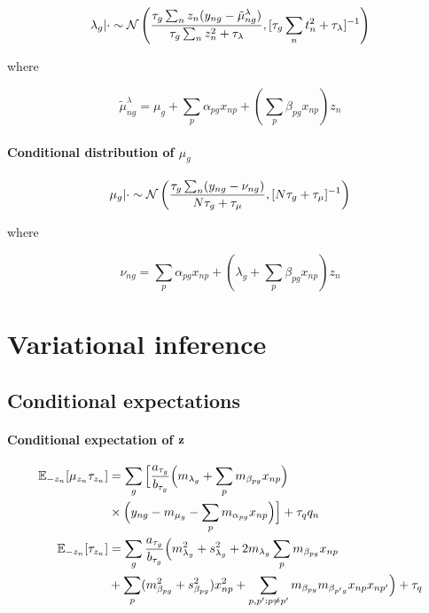 \begin{equation}
\lambda_g | \cdot \sim \mathcal{N}\left(
\frac{\tau_g \sum_n z_n(y_{ng} - \tilde{\mu}^\lambda_{ng})}{\tau_g \sum_n z_n^2 + \tau_\lambda},
[\tau_g \sum_n t_n^2 + \tau_\lambda]^{-1}
\right)
\end{equation}

where

\begin{equation}
\tilde{\mu}^\lambda_{ng} = \mu_g + \sum_p \alpha_{pg} x_{np} + \left( \sum_p \beta_{pg} x_{np} \right) z_n
\end{equation}

\paragraph{Conditional distribution of $\mu_g$}

\begin{equation}
\mu_g | \cdot \sim \mathcal{N}\left(
\frac{\tau_g \sum_n(y_{ng} - \nu_{ng})}{N \tau_g + \tau_\mu}, [N \tau_g + \tau_\mu]^{-1}
\right)
\end{equation}

where

\begin{equation}
\nu_{ng} = \sum_p \alpha_{pg} x_{np} + \left( \lambda_g + \sum_p \beta_{pg} x_{np} \right) z_n
\end{equation}



\section{Variational inference} \label{app:clvm_vi}

\subsection{Conditional expectations}


\paragraph{Conditional expectation of $\mathbf{z}$}

\begin{equation}
\begin{aligned}
\mathbb{E}_{-z_n}[\mu_{z_n}\tau_{z_n}] & = \sum_g \Big[ \frac{a_{\tau_g}}{b_{\tau_g}}
\Big( m_{\lambda_g} + \sum_p m_{\beta_{pg}} x_{np} \Big) \\
& \times \Big( y_{ng} - m_{\mu_g} - \sum_p m_{\alpha_{pg}} x_{np} \Big)
\Big] + \tau_q q_n \\
\mathbb{E}_{-z_n} [\tau_{z_n}] & = \sum_g \frac{a_{\tau_g}}{b_{\tau_g}}
 \Big(m_{\lambda_g}^2 + s_{\lambda_g}^2 + 2m_{\lambda_g} \sum_p m_{\beta_{pg}} x_{np} \\
 & + \sum_p (m_{\beta_{pg}}^2 + s_{\beta_{pg}}^2) x_{np}^2 +
 \sum_{p,p': p \neq p'} m_{\beta_{pg}} m_{\beta_{p'g}} x_{np}x_{np'}
\Big) + \tau_q
\end{aligned}
\end{equation}

